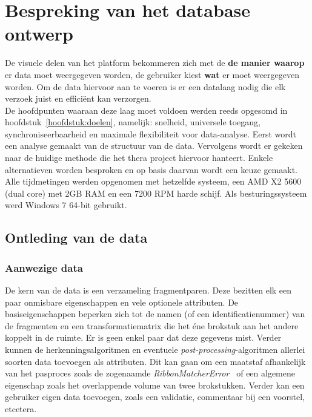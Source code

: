 \chapter{Bespreking van het database ontwerp}
\label{hoofdstuk:database}
De visuele delen van het platform bekommeren zich met de \textbf{de manier waarop} er data moet weergegeven worden, de gebruiker kiest \textbf{wat} er moet weergegeven worden. Om de data hiervoor aan te voeren is er een datalaag nodig die elk verzoek juist en effici\"ent kan verzorgen.\\

De hoofdpunten waaraan deze laag moet voldoen werden reeds opgesomd in hoofdstuk~\ref{hoofdstuk:doelen}, namelijk: snelheid, universele toegang, synchroniseerbaarheid en maximale flexibiliteit voor data-analyse. Eerst wordt een analyse gemaakt van de structuur van de data. Vervolgens wordt er gekeken naar de huidige methode die het thera project hiervoor hanteert. Enkele alternatieven worden besproken en op basis daarvan wordt een keuze gemaakt.\\

Alle tijdmetingen werden opgenomen met hetzelfde systeem, een AMD X2 5600 (dual core) met 2GB RAM en een 7200 RPM harde schijf. Als besturingssysteem werd Windows 7 64-bit gebruikt.

\section{Ontleding van de data}

\subsection{Aanwezige data}
De kern van de data is een verzameling fragmentparen. Deze bezitten elk een paar onmisbare eigenschappen en vele optionele attributen. De basiseigenschappen beperken zich tot de namen (of een identificatienummer) van de fragmenten en een transformatiematrix die het \'ene brokstuk aan het andere koppelt in de ruimte. Er is geen enkel paar dat deze gegevens mist. Verder kunnen de herkenningsalgoritmen en eventuele \emph{post-processing}-algoritmen allerlei soorten data toevoegen als attributen. Dit kan gaan om een maatstaf afhankelijk van het pasproces zoals de zogenaamde \emph{RibbonMatcherError}~\cite{Brown2008} of een algemene eigenschap zoals het overlappende volume van twee brokstukken. Verder kan een gebruiker eigen data toevoegen, zoals een validatie, commentaar bij een voorstel, etcetera.

